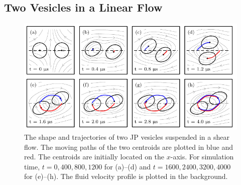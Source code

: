 \documentclass[lineno]{jfm}
\begin{document}
\subsection{Two Vesicles in a Linear Flow}

\begin{figure}
\begin{center}
\includegraphics[width=\textwidth]{Figure9_Wrapper.pdf}
\end{center} 
  \caption{\label{figure9} The shape and trajectories of two
  JP vesicles suspended in a shear flow. The moving paths of the two
  centroids are plotted in blue and red. The centroids are initially
  located on the $x$-axis. For simulation time, $t = {0, 400,800,1200}$
  for (a)--(d) and $t = {1600, 2400, 3200, 4000}$ for (e)--(h).
  The fluid velocity profile is plotted in the background.
  }
\end{figure}
\end{document}
